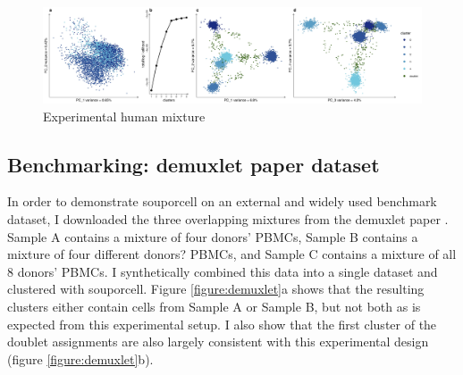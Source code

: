 \begin{figure}[th!]
\caption{Experimental human mixture}
\label{figure:real}
\begin{centering}
\includegraphics[width=\textwidth]{realmix.jpg} 
\end{centering}
\end{figure}





\subsection{Benchmarking: demuxlet paper dataset}

\par{
In order to demonstrate souporcell on an external and widely used benchmark dataset, I downloaded the
three overlapping mixtures from the demuxlet paper\cite{demuxlet}
. Sample A contains a mixture of four donors'
PBMCs, Sample B contains a mixture of four different donors? PBMCs, and Sample C contains a mixture
of all 8 donors' PBMCs. I synthetically combined this data into a single dataset and clustered with
souporcell. Figure \ref{figure:demuxlet}a shows that the resulting clusters either contain cells from Sample A or Sample B,
but not both as is expected from this experimental setup. I also show that the first cluster of the doublet
assignments are also largely consistent with this experimental design (figure \ref{figure:demuxlet}b). 
}

